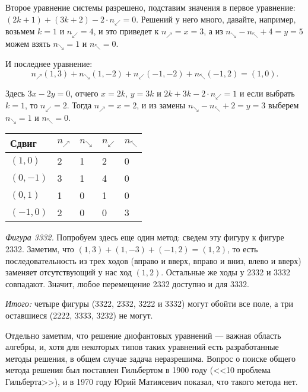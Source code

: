 \begin{itemize}
Второе уравнение системы разрешено, подставим значения в первое уравнение:
$(2k + 1) + (3k + 2) -2\cdot n_\swarrow = 0$. Решений у него много, давайте, например, 
возьмем $k = 1$ и $n_\swarrow=4$, и это приведет к $n_\nearrow = x = 3$, а из 
$n_\searrow - n_\nwarrow + 4 = y = 5$ можем взять $n_\searrow = 1$ и $n_\nwarrow = 0$.


И последнее уравнение:
$$n_\nearrow(1,3) + n_\searrow(1,-2) + n_\swarrow(-1,-2) + n_\nwarrow(-1,2) = (1,0).$$

Здесь $3x - 2y = 0$, отчего $x = 2k$, $y = 3k$ и $2k + 3k - 2\cdot n_\swarrow = 1$ и
если выбрать $k=1$, то $n_\swarrow = 2$. Тогда $n_\nearrow = x = 2$, 
и из замены $n_\searrow - n_\nwarrow + 2 = y = 3$ выберем $n_\searrow = 1$ и $n_\nwarrow = 0$.


\begin{center}\begin{tabular}{lllll}
Сдвиг & $n_\nearrow$ & $n_\searrow$ & $n_\swarrow$ & $n_\nwarrow$ \\
\hline
$(1,0)$  & 2 & 1 & 2 & 0\\
$(0,-1)$ & 3 & 1 & 4 & 0\\
$(0,1)$  & 1 & 0 & 1 & 0\\
$(-1,0)$ & 2 & 0 & 0 & 3
\end{tabular}\end{center}

\emph{Фигура 3332.} Попробуем здесь еще один метод: сведем эту фигуру к фигуре 2332. 
Заметим, что $(1,3)+(1,-3)+(-1,2) = (1,2)$, то есть последовательность из трех ходов 
(вправо и вверх, вправо и вниз, влево и вверх) заменяет отсутствующий у нас ход $(1,2)$. 
Остальные же ходы у 2332 и 3332 совпадают. Значит, любое перемещение 2332 доступно и 
для 3332.

\emph{Итого:} четыре фигуры (3322, 2332, 3222 и 3332) могут обойти все поле, а три оставшиеся
(2222, 3333, 3232) не могут.

Отдельно заметим, что решение диофантовых уравнений --- важная область алгебры, и, хотя для некоторых
типов таких уравнений есть разработанные методы решения, в общем случае задача неразрешима. 
Вопрос о поиске общего метода решения был поставлен Гильбертом в 1900 году (<<10 проблема Гильберта>>), 
и в 1970 году Юрий Матиясевич показал, что такого метода нет.

\end{itemize}

